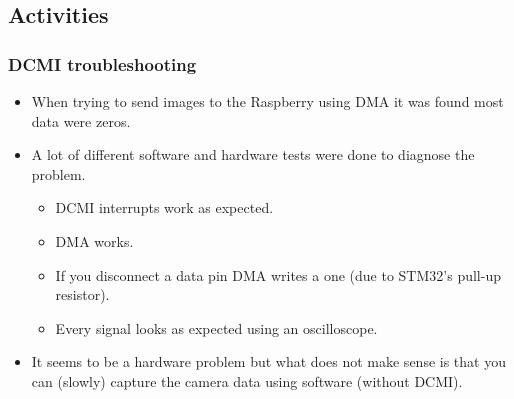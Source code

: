 \subsection{Activities}


\subsubsection{DCMI troubleshooting}
\begin{itemize}
	\item When trying to send images to the Raspberry using DMA it was found most data were zeros.
	\item A lot of different software and hardware tests were done to diagnose the problem.
	\begin{itemize}
		\item DCMI interrupts work as expected.
		\item DMA works.
		\item If you disconnect a data pin DMA writes a one (due to STM32's pull-up resistor).
		\item Every signal looks as expected using an oscilloscope.
	\end{itemize}
	\item It seems to be a hardware problem but what does not make sense is that you can (slowly) capture the camera data using software (without DCMI).
\end{itemize}


